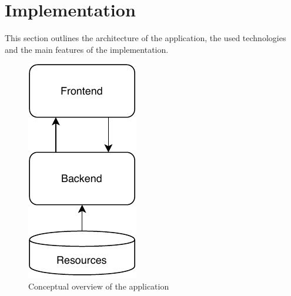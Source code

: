 \documentclass[a4paper]{article}
\begin{document}
\section{Implementation}
This section outlines the architecture of the application, the used technologies and the main features of the implementation.
\begin{figure}
    \centering
    \includegraphics[scale=1]{figures/arch}
    \caption{Conceptual overview of the application}
    \label{fig:arch}
\end{figure}
\end{document}

